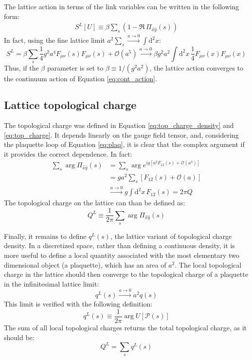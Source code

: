 The lattice action in terms of the link variables can be written in the following form:
\begin{equation}\label{eq:lat_action}
    \begin{aligned}
        S^L[U] \equiv \beta\sum_s\left(1-\Re\,\Pi_{\hat x\hat y}(s)\right)
    \end{aligned}
\end{equation}
In fact, using the fine lattice limit $a^2\sum_s \xrightarrow{a\to0} \int\mathrm d^2x$:
\[
    S^L = \beta\sum_s\frac{1}{4}g^2a^4F_{\mu\nu}(s)F_{\mu\nu}(s) + \mathcal O\left(a^5\right)
      \xrightarrow{a\to0} \beta g^2a^2\int\mathrm d^2x\,\frac{1}{4}F_{\mu\nu}(x)F_{\mu\nu}(x)
\]
Thus, if the $\beta$ parameter is set to $\beta \equiv 1/(g^2a^2)$,
the lattice action converges to the continuum action of Equation \eqref{eq:cont_action}.

\subsection*{Lattice topological charge}

The topological charge was defined in Equation \eqref{eq:top_charge_density} and \eqref{eq:top_charge}.
It depends linearly on the gauge field tensor, and,
considering the plaquette loop of Equation \eqref{eq:plaq},
it is clear that the complex argument if it provides the correct dependence.
In fact:
\[
    \begin{aligned}
        \sum_s\arg\Pi_{\hat x\hat y}(s) &= \sum_s\arg e^{ig\left[a^2F_{12}(s) + \mathcal O\left(a^3\right)\right]} \\
                                        &= ga^2\sum_s\left[F_{12}(s) + \mathcal O\left(a\right)\right] \\
                                        &\xrightarrow{a\to0} g\int\mathrm d^2x\,F_{12}(s) = 2\pi Q
    \end{aligned}
\]
The topological charge on the lattice can than be defined as:
\begin{equation}\label{eq:lat_top_charge}
    Q^L \equiv \frac{1}{2\pi}\sum_s\arg\Pi_{\hat x\hat y}(s)
\end{equation}

Finally, it remains to define $q^L(s)$, the lattice variant of topological charge density.
In a discretized space, rather than defining a continuous density,
it is more useful to define a local quantity associated with the most elementary two dimensional object (\ie a plaquette),
which has an area of $a^2$.
The local topological charge in the lattice should then converge to the topological charge of a plaquette in the infinitesimal lattice limit:
\[
    q^L(s) \xrightarrow{a\to0} a^2q(s)
\]
This limit is verified with the following definition:
\begin{equation}\label{eq:lat_loc_top_charge}
    q^L(s) \equiv \frac{1}{2\pi}\arg U[\mathcal P(s)]
\end{equation}
The sum of all local topological charges returns the total topological charge, as it should be:
\[
    Q^L = \sum_sq^L(s)
\]

